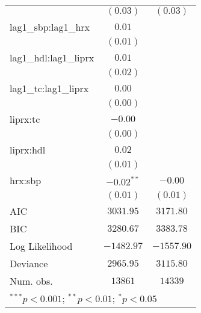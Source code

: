\begin{tabular}{l c c}
                      & $(0.03)$      & $(0.03)$      \\
lag1\_sbp:lag1\_hrx   & $0.01$        &               \\
                      & $(0.01)$      &               \\
lag1\_hdl:lag1\_liprx & $0.01$        &               \\
                      & $(0.02)$      &               \\
lag1\_tc:lag1\_liprx  & $0.00$        &               \\
                      & $(0.00)$      &               \\
liprx:tc              & $-0.00$       &               \\
                      & $(0.00)$      &               \\
liprx:hdl             & $0.02$        &               \\
                      & $(0.01)$      &               \\
hrx:sbp               & $-0.02^{**}$  & $-0.00$       \\
                      & $(0.01)$      & $(0.01)$      \\
\midrule
AIC                   & $3031.95$     & $3171.80$     \\
BIC                   & $3280.67$     & $3383.78$     \\
Log Likelihood        & $-1482.97$    & $-1557.90$    \\
Deviance              & $2965.95$     & $3115.80$     \\
Num. obs.             & $13861$       & $14339$       \\
\bottomrule
\multicolumn{3}{l}{\scriptsize{$^{***}p<0.001$; $^{**}p<0.01$; $^{*}p<0.05$}}
\end{tabular}
